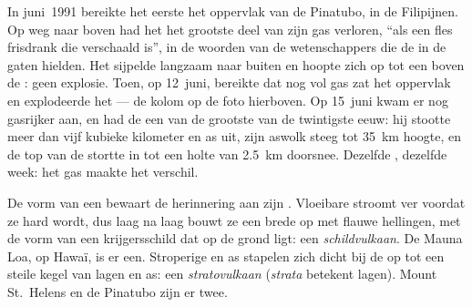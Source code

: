 \begin{example}\label{ex:g7:volcanoes:pinatubo}
In juni~1991 bereikte het eerste  het oppervlak van de Pinatubo, in de
Filipijnen. Op weg naar boven had het het grootste deel van zijn gas
verloren, ``als een fles frisdrank die verschaald is'', in de woorden van de
wetenschappers die de  in de gaten hielden. Het sijpelde langzaam
naar buiten en hoopte zich op tot een  boven de : geen
explosie. Toen, op 12~juni, bereikte  dat nog vol gas zat het
oppervlak en explodeerde het --- de kolom op de foto hierboven. Op 15~juni
kwam er nog gasrijker  aan, en had de  een van de grootste
 van de twintigste eeuw: hij stootte meer dan vijf kubieke
kilometer  en as uit, zijn aswolk steeg tot \qty{35}{km} hoogte,
en de top van de  stortte in tot een holte van \qty{2.5}{km} doorsnee.
Dezelfde , dezelfde week: het gas maakte het verschil.
\end{example}

De vorm van een  bewaart de herinnering aan zijn .
Vloeibare  stroomt ver voordat ze hard wordt, dus laag na laag bouwt ze
een brede  op met flauwe hellingen, met de vorm van een krijgersschild
dat op de grond ligt: een \emph{schildvulkaan}. De Mauna Loa, op Hawaï, is
er een. Stroperige  en as stapelen zich dicht bij de  op
tot een steile kegel van lagen  en as: een \emph{stratovulkaan}
(\emph{strata} betekent lagen). Mount St.~Helens en de Pinatubo zijn er
twee.


